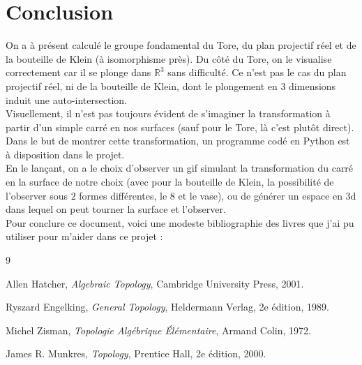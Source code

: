 \section{Conclusion}
On a à présent calculé le groupe fondamental du Tore, du plan projectif réel et de la bouteille de Klein (à isomorphisme près). Du côté du Tore, on le visualise correctement car il se plonge dans $\mathbb{R}^3$ sans difficulté. Ce n'est pas le cas du plan projectif réel, ni de la bouteille de Klein, dont le plongement en $3$ dimensions induit une auto-intersection.\medskip\\
Visuellement, il n'est pas toujours évident de s'imaginer la transformation à partir d'un simple carré en nos surfaces (sauf pour le Tore, là c'est plutôt direct). Dans le but de montrer cette transformation, un programme codé en Python est à disposition dans le projet.\medskip\\
En le lançant, on a le choix d'observer un gif simulant la transformation du carré en la surface de notre choix (avec pour la bouteille de Klein, la possibilité de l'observer sous $2$ formes différentes, le $8$ et le vase), ou de générer un espace en 3d dans lequel on peut tourner la surface et l'observer.\medskip\\
Pour conclure ce document, voici une modeste bibliographie des livres que j'ai pu utiliser pour m'aider dans ce projet :
\begin{thebibliography}{9}

Allen Hatcher,
\textit{Algebraic Topology},
Cambridge University Press, 2001.

Ryszard Engelking,
\textit{General Topology},
Heldermann Verlag, 2e édition, 1989.

Michel Zisman,
\textit{Topologie Algébrique Élémentaire},
Armand Colin, 1972.

James R. Munkres,
\textit{Topology},
Prentice Hall, 2e édition, 2000.

\end{thebibliography}